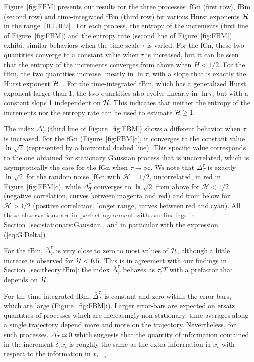 \documentclass[aps,pra,groupedaddress,notitlepage]{revtex4-1}
\begin{document}
Figure~\ref{fig:FBM} presents our results for the three processes: fGn (first row), fBm (second row) and time-integrated fBm (third row) for various Hurst exponents ${\cal H}$ in the range $[0.1, 0.9]$. 
For each process, the entropy of the increments (first line of Figure~\ref{fig:FBM}) and the entropy rate (second line of Figure~\ref{fig:FBM}) exhibit similar behaviors when the time-scale $\tau$ is varied.
%
For the fGn, these two quantities converge to a constant value when $\tau$ is increased, but it can be seen that the entropy of the increments converges from above when $H<1/2$. For the fBm, the two quantities increase linearly in $\ln\tau$, with a slope that is exactly the Hurst exponent ${\cal H}$~\cite{GBelinchon2016,GraneroBelinchon2018}.
For the time-integrated fBm, which has a generalized Hurst exponent larger than 1, the two quantities also evolve linearly in $\ln\tau$, but with a constant slope 1 independent on ${\cal H}$. This indicates that neither the entropy of the increments nor the entropy rate can be used to estimate ${\cal H}\ge 1$. 

The index ${\Delta}_T^{\tau}$ (third line of Figure~\ref{fig:FBM}) shows a different behavior when $\tau$ is increased. For the fGn (Figure~\ref{fig:FBM}c), it converges to the constant value $\ln\sqrt{2}$ (represented by a horizontal dashed line). This specific value corresponds to the one obtained for stationary Gaussian process that is uncorrelated, which is asymptotically the case for the fGn when $\tau \rightarrow \infty$. We note that ${\Delta}_T^{\tau}$ is exactly $\ln\sqrt{2}$ for the random noise (fGn with $\mathcal{H}=1/2$, uncorrelated, in red in Figure~\ref{fig:FBM}c), while ${\Delta}_T^{\tau}$ converges to $\ln\sqrt{2}$ from above for $\mathcal{H}<1/2$ (negative correlation, curves between magenta and red) and from below for $\mathcal{H}>1/2$ (positive correlation, longer range, curves between red and cyan). All these observations are in perfect agreement with our findings in Section~\ref{sec:stationary:Gaussian}, and in particular with the expression (\ref{eq:G:Delta}).

For the fBm, $\bar{\Delta}_T^{\tau}$ is very close to zero to most values of ${\cal H}$, although a little increase is observed for ${\cal H}< 0.5$. This is in agreement with our findings in Section~\ref{sec:theory:fBm}: the index $\bar{\Delta}_T^{\tau}$ behaves as $\tau/T$ with a prefactor that depends on ${\cal H}$.

For the time-integrated fBm, $\bar{\Delta}_T^{\tau}$ is constant and zero within the error-bars, which are large (Figure~\ref{fig:FBM}i). Larger error-bars are expected on ersatz quantities of processes which are increasingly non-stationary: time-averages along a single trajectory depend more and more on the trajectory. Nevertheless, for such processes, $\bar{\Delta}_T^{\tau} \simeq 0$ which suggests that the quantity of information contained in the increment $\delta_\tau x_t$ is roughly the same as the extra information in $x_t$ with respect to the information in $x_{t-\tau}$.
\end{document}
